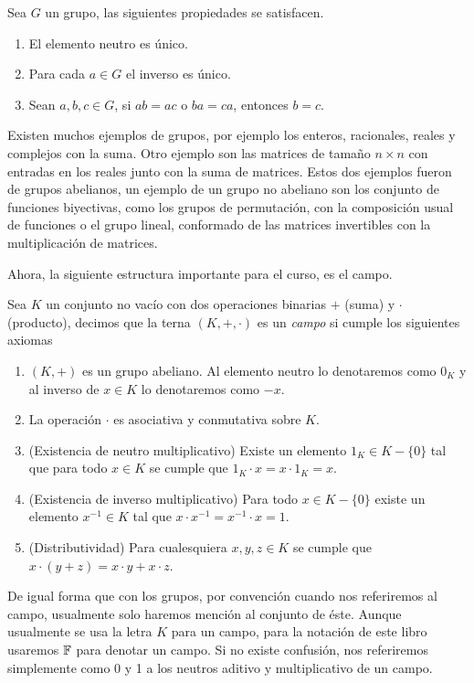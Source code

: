 \begin{teor}
  Sea $G$ un grupo, las siguientes propiedades se satisfacen.
    \begin{enumerate}
      \item El elemento neutro es único.
      \item Para cada $a \in G$ el inverso es único.
      \item Sean $a,b,c \in G$, si $ab=ac$ o $ba=ca$, entonces $b=c$.
    \end{enumerate}
\end{teor}

Existen muchos ejemplos de grupos, por ejemplo los enteros, racionales, reales y complejos con la suma. Otro ejemplo son las matrices de tamaño $n \times n$ con entradas en los reales junto con la suma de matrices. Estos dos ejemplos fueron de  grupos abelianos, un ejemplo de un grupo no abeliano son los conjunto de funciones biyectivas, como los grupos de permutación, con la composición usual de funciones o el grupo lineal, conformado de las matrices invertibles con la multiplicación de matrices.

Ahora, la siguiente estructura importante para el curso, es el campo.

\begin{defi}
  Sea $K$ un conjunto no vacío con dos operaciones binarias $+$ (suma) y $\cdot$ (producto), decimos que la terna $(K, +, \cdot)$ es un \emph{campo} si cumple los siguientes axiomas
  \begin{enumerate}
    \item $(K,+)$ es un grupo abeliano. Al elemento neutro lo denotaremos como $0_K$ y al inverso de $x \in K$ lo denotaremos como $-x$.
    \item La operación $\cdot$ es asociativa y conmutativa sobre $K$.
    \item (Existencia de neutro multiplicativo) Existe un elemento $1_K \in K-\{0\}$ tal que para todo $x \in K$ se cumple que $1_K\cdot x = x\cdot 1_K = x$.
    \item (Existencia de inverso multiplicativo) Para todo $x \in K-\{0\}$ existe un elemento $ x^{-1} \in K$ tal que $x \cdot x^{-1} = x^{-1} \cdot x = 1$.
    \item (Distributividad) Para cualesquiera $x, y, z \in K$ se cumple que $x \cdot (y + z) = x \cdot y + x \cdot z$.
  \end{enumerate}
\end{defi}

De igual forma que con los grupos, por convención cuando nos referiremos al campo, usualmente solo haremos mención al conjunto de éste. Aunque usualmente se usa la letra $K$ para un campo, para la notación de este libro usaremos $\mathbb{F}$ para denotar un campo. Si no existe confusión, nos referiremos simplemente como 0 y 1 a los neutros aditivo y multiplicativo de un campo.

